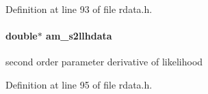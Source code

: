 Definition at line 93 of file rdata.\+h.

\hypertarget{struct_return_data_ae3b580f13058daf716d947dd7a0e9cd8}{}
\paragraph[{am\+\_\+s2llhdata}]{\setlength{\rightskip}{0pt plus 5cm}double$\ast$ am\+\_\+s2llhdata}\label{struct_return_data_ae3b580f13058daf716d947dd7a0e9cd8}
second order parameter derivative of likelihood 

Definition at line 95 of file rdata.\+h.

